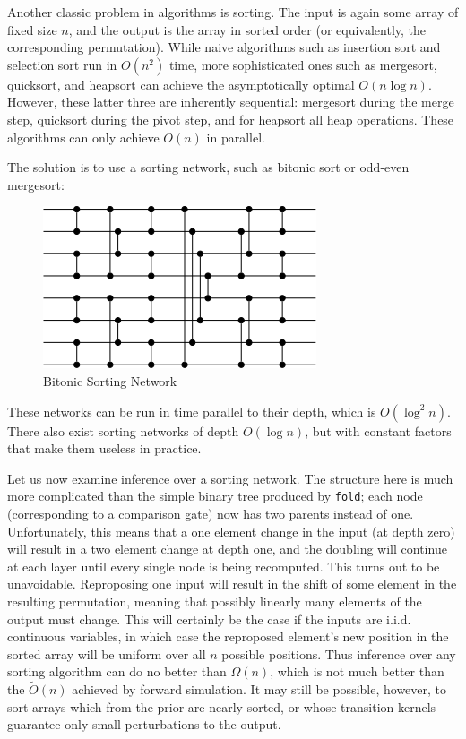 \documentclass[11pt]{article}
\begin{document}
Another classic problem in algorithms is sorting. The input is again some array of fixed size $n$, and the output is the array in sorted order (or equivalently, the corresponding permutation). While naive algorithms such as insertion sort and selection sort run in $O(n^2)$ time, more sophisticated ones such as mergesort, quicksort, and heapsort can achieve the asymptotically optimal $O(n\log n)$. However, these latter three are inherently sequential: mergesort during the merge step, quicksort during the pivot step, and for heapsort all heap operations. These algorithms can only achieve $O(n)$ in parallel.

The solution is to use a sorting network, such as bitonic sort or odd-even mergesort:

\begin{figure}[h]
\centering
    \includegraphics{bitonic.png}
\caption{Bitonic Sorting Network}
\end{figure}

These networks can be run in time parallel to their depth, which is $O(\log^2 n)$. There also exist sorting networks of depth $O(\log n)$, but with constant factors that make them useless in practice.

Let us now examine inference over a sorting network. The structure here is much more complicated than the simple binary tree produced by \texttt{fold}; each node (corresponding to a comparison gate) now has two parents instead of one. Unfortunately, this means that a one element change in the input (at depth zero) will result in a two element change at depth one, and the doubling will continue at each layer until every single node is being recomputed. This turns out to be unavoidable. Reproposing one input will result in the shift of some element in the resulting permutation, meaning that possibly linearly many elements of the output must change. This will certainly be the case if the inputs are i.i.d. continuous variables, in which case the reproposed element's new position in the sorted array will be uniform over all $n$ possible positions. Thus inference over any sorting algorithm can do no better than $\Omega(n)$, which is not much better than the $\tilde{O}(n)$ achieved by forward simulation. It may still be possible, however, to sort arrays which from the prior are nearly sorted, or whose transition kernels guarantee only small perturbations to the output. 
\end{document}
